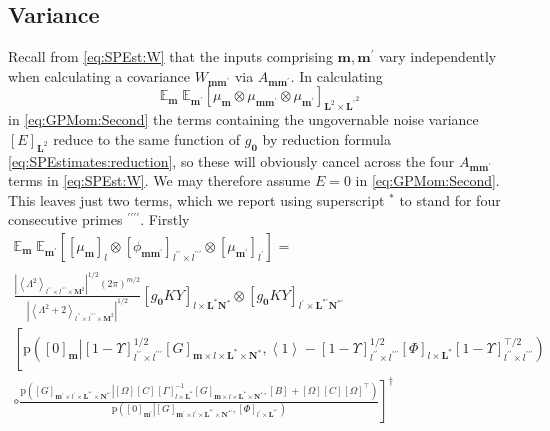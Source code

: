 \documentclass[preprint,12pt]{elsarticle}
\newcommand*{\M}[1]{\ensuremath{#1}\xspace}
\newcommand*{\x}{\times}
\newcommand*{\mi}[1]{\mathbf{#1}}
\newcommand*{\te}[2][]{\left\lbrack{#2}\right\rbrack_{#1}}
\newcommand*{\diag}[2][]{\left\langle{#2}\right\rangle_{#1}}
\newcommand*{\prob}[3]{\M{\mathrm{p}\!\left(\left.{#1}\right\vert{#2,#3}\right)}}
\newcommand*{\evt}[3][]{\mathbb{E}_{#3}^{#1}\!#2}
\newcommand*{\modulus}[1]{\M{\left\lvert{#1}\right\rvert}}
\begin{document}
    \subsection{Variance}\label{sub:GPEst:Variance}
        Recall from \cref{eq:SPEst:W} that the inputs comprising $\mi{m},\mi{m^{\prime}}$ vary independently when calculating a covariance $W_{\mi{m m^{\prime}}}$ via $A_{\mi{m m^{\prime}}}$. In calculating
        \begin{equation*}
            \evt{\;\evt{\te[\mi{L}^{2} \x \mi{L^{\prime}}^{2}]{\mu_{\mi{m}} \otimes \mu_{\mi{mm^{\prime}}} \otimes \mu_{\mi{m^{\prime}}}}}{\mi{m^{\prime}}}}{\mi{m}}
        \end{equation*}
        in \cref{eq:GPMom:Second} the terms containing the ungovernable noise variance $\te[\mi{L}^2]{E}$ reduce to the same function of $g_{\mi{0}}$ by reduction formula \cref{eq:SPEstimates:reduction}, so these will obviously cancel across the four $A_{\mi{m m^{\prime}}}$ terms in \cref{eq:SPEst:W}. 
        We may therefore assume $E=0$ in \cref{eq:GPMom:Second}. This leaves just two terms, which we report using superscript $^{*}$ to stand for four consecutive primes $^{\prime\prime\prime\prime}$. Firstly
        \begin{multline*}
            \evt{\;\evt{\te[]{\te[l]{\mu_{\mi{m}}} \otimes \te[l^{\prime\prime}\x l^{\prime\prime\prime}]{\phi_{\mi{mm^{\prime}}}} \otimes \te[l^{\prime}]{\mu_{\mi{m^{\prime}}}}}}{\mi{m^{\prime}}}}{\mi{m}} = \\
            \frac
            {\modulus{\diag[l^{\prime\prime}\x l^{\prime\prime\prime}\x\mi{M}^{2}]{\Lambda^{2}}}^{1/2}(2\pi)^{m/2}}
            {\modulus{\diag[l^{\prime\prime}\x l^{\prime\prime\prime}\x\mi{M}^2]{\Lambda^{2}+2}}^{1/2}}
            \te[l\x\mi{L^{*}N^{*}}]{g_{\mi{0}}KY} \otimes
            \te[l^{\prime}\x\mi{L^{*\prime}N^{*\prime}}]{g_{\mi{0}}KY} \\
            \left\lbrack
            \prob{\te[\mi{m}]{0}}{\te[l^{\prime\prime}\x l^{\prime\prime\prime}]{1-\Upsilon}^{1/2} \te[\mi{m}\x l\x \mi{L^{*}\x N^{*}}]{G}} 
            {\diag[]{1} -
            \te[l^{\prime\prime}\x l^{\prime\prime\prime}]{1-\Upsilon}^{1/2} \te[l\x \mi{L^{*}}]{\Phi}\te[l^{\prime\prime}\x l^{\prime\prime\prime}]{1-\Upsilon}^{\intercal/2}} \phantom{\frac{_{\vert}^{\vert}}{_{\vert}^{\vert}}} \right.\\
            \left. \circ 
                \frac{
                    \prob{\te[\mi{m^{\prime}}\x l^{\prime}\x \mi{L^{*\prime}\x N^{*\prime}}]{G}}
                    {\te[]{\Omega} \te[]{C} \te[l\x \mi{L^{*}}]{\Gamma}^{-1} \te[\mi{m}\x l\x \mi{L^{*}\x N^{*}}]{G}}{\te[]{B}+\te[]{\Omega} \te[]{C} \te[]{\Omega}^{\intercal}}}
                    {\prob{\te[\mi{m^{\prime}}]{0}}{\te[\mi{m^{\prime}}\x l^{\prime}\x \mi{L^{*\prime}\x N^{*\prime}}]{G}}{\te[l^{\prime}\x \mi{L^{*\prime}}]{\Phi}}}
            \right\rbrack^{\dagger}
        \end{multline*}
\end{document}
